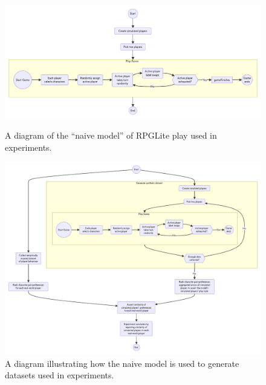 \begin{figure}[tp]
  \centering
  \includegraphics[width=\columnwidth]{60_optimisation_with_aspects/diagrams/naive_model.pdf}
  \caption{A diagram of the ``naive model'' of RPGLite play used in experiments.}
  \label{fig:naive_model}
  \medskip
  \includegraphics[width=\columnwidth]{60_optimisation_with_aspects/diagrams/experiment_setup_for_datagen.pdf}
  \caption{A diagram illustrating how the naive model is used to generate datasets used in experiments.}
  \label{fig:naive_model_with_experimental_apparatus}
\end{figure}




